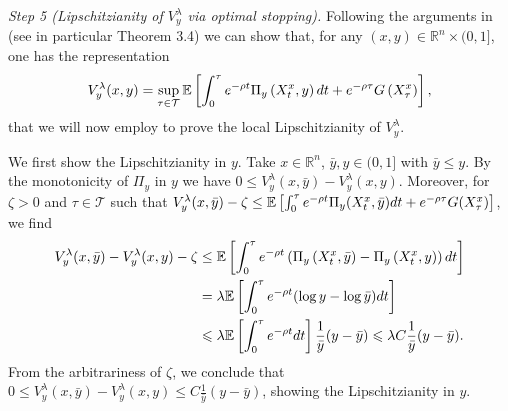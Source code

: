 \documentclass[11pt]{amsart}
\theoremstyle{plain}
\def \dd{{\rm d}}
\numberwithin{equation}{section}
\begin{document}
\smallbreak\noindent
\emph{Step 5 (Lipschitzianity of $V^\lambda_y$ via optimal stopping).}
Following the arguments in \cite{Karatzas&Shreve84} (see in particular Theorem 3.4) we can show that, for any $(x, y) \in \mathbb{R}^{n} \times(0,1]$, one has the representation
\begin{equation*}
V^\lambda_y (x, y) =\sup _{\tau \in \mathcal T} \mathbb{E}\left[\int_{0}^{\tau} e ^{-\rho t} \Pi_{y}\left(X^x_{t}, y\right) \dd t+e^{-\rho {\tau}} G\left(X^x_{\tau}\right)\right],  
\end{equation*}
that we will now employ to prove the local Lipschitzianity of $V^\lambda_y$.

We first show the Lipschitzianity in $y$. 
Take $x \in \mathbb{R}^{n}$, $\bar{y}, y \in (0,1]$ with $\bar y \leq y$. 
By the monotonicity of $\Pi_y$ in $y$ we have $0 \leq  V^\lambda_y(x, \bar{y})-V^\lambda_y(x, y) $. 
Moreover, 
for $\zeta>0$ and  $\tau \in \mathcal T$ such that $ V^\lambda_y (x, \bar{y})  - \zeta 
  \leq \mathbb{E}\left[\int_{0}^{\tau} e ^{-\rho t} \Pi_{y}(X_{t}^x, \bar{y}) \dd t + e^{-\rho \tau} G(X^x_\tau ) \right]$, we find
$$
\begin{aligned}
 V^\lambda_y (x, \bar{y})-V^\lambda_y(x, y) - \zeta 
 & \leq \mathbb{E}\left[\int_{0}^{\tau} e ^{-\rho t}\left(\Pi_{y}\left(X_{t}^x, \bar{y}\right)-\Pi_{y}\left(X_{t}^x, y\right)\right) \dd t\right] \\
& = \lambda \mathbb{E}\left[\int_{0}^{\tau} e ^{-\rho t}(\log y - \log \bar{y}) \dd t\right] \\
& \leqslant \lambda \mathbb{E}\left[\int_{0}^{\tau} e ^{-\rho t} \dd t\right] \frac{1}{\bar{y}}(y - \bar y) 
\leqslant \lambda C  \frac{1}{\bar{y}} (y - \bar y) .
\end{aligned}
$$
From the arbitrariness of $\zeta$, we conclude that
$0 \leqslant V^\lambda_y(x, \bar{y})-V^\lambda_y(x, y) \leqslant C \frac{1}{\bar{y}} (y - \bar y)$, showing the Lipschitzianity in $y$. 
\end{document}
